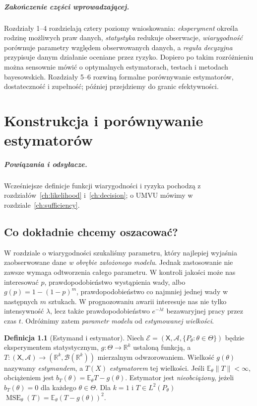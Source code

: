 \documentclass[11pt,a4paper,oneside]{report}
\numberwithin{equation}{chapter}
\theoremstyle{plain}
\theoremstyle{definition}
\newtheorem{definicja}{Definicja}[chapter]
\theoremstyle{remark}
\newcommand{\R}{\mathbb R}
\newcommand{\E}{\mathbb E}
\newcommand{\calA}{\mathcal A}
\newcommand{\calB}{\mathcal B}
\begin{document}
\paragraph{Zakończenie części wprowadzającej.}
Rozdziały 1--4 rozdzielają cztery poziomy wnioskowania:
\emph{eksperyment} określa rodzinę możliwych praw danych,
\emph{statystyka} redukuje obserwacje,
\emph{wiarygodność} porównuje parametry względem obserwowanych danych,
a \emph{reguła decyzyjna} przypisuje danym działanie oceniane przez
ryzyko. Dopiero po takim rozróżnieniu można sensownie mówić o
optymalnych estymatorach, testach i metodach bayesowskich.
Rozdziały 5--6 rozwiną formalne porównywanie estymatorów,
dostateczność i zupełność; później przejdziemy do granic efektywności.


\chapter{Konstrukcja i porównywanie estymatorów}
\label{ch:estimators}
\paragraph{Powiązania i odsyłacze.} Wcześniejsze definicje funkcji wiarygodności i ryzyka pochodzą z rozdziałów~\ref{ch:likelihood} i~\ref{ch:decision}; o UMVU mówimy w rozdziale~\ref{ch:sufficiency}.


\section{Co dokładnie chcemy oszacować?}
W rozdziale o wiarygodności szukaliśmy parametru, który najlepiej
wyjaśnia zaobserwowane dane \emph{w obrębie założonego modelu}.
Jednak zastosowanie nie zawsze wymaga odtworzenia całego parametru.
W kontroli jakości może nas interesować $p$, prawdopodobieństwo
wystąpienia wady, albo $g(p)=1-(1-p)^m$, prawdopodobieństwo
co najmniej jednej wady w następnych $m$ sztukach. W prognozowaniu
awarii interesuje nas nie tylko intensywność $\lambda$, lecz także
prawdopodobieństwo $e^{-\lambda t}$ bezawaryjnej pracy przez czas $t$.
Odróżnimy zatem \emph{parametr modelu} od \emph{estymowanej wielkości}.

\begin{definicja}[Estymand i estymator]\label{def:estimand}
Niech $\mathcal E=(\mathsf X,\calA,\{P_\theta:\theta\in\Theta\})$
będzie eksperymentem statystycznym, $g:\Theta\to\R^k$ ustaloną
funkcją, a $T:(\mathsf X,\calA)\to(\R^k,\calB(\R^k))$
mierzalnym odwzorowaniem. Wielkość $g(\theta)$ nazywamy
\emph{estymandem}, a $T(X)$ \emph{estymatorem} tej wielkości.
Jeśli $\E_\theta\|T\|<\infty$, obciążeniem jest
$b_T(\theta)=\E_\theta T-g(\theta)$. Estymator jest
\emph{nieobciążony}, jeżeli $b_T(\theta)=0$ dla każdego
$\theta\in\Theta$. Dla $k=1$ i $T\in L^2(P_\theta)$
$\operatorname{MSE}_\theta(T)=\E_\theta(T-g(\theta))^2$.
\end{definicja}
\end{document}

